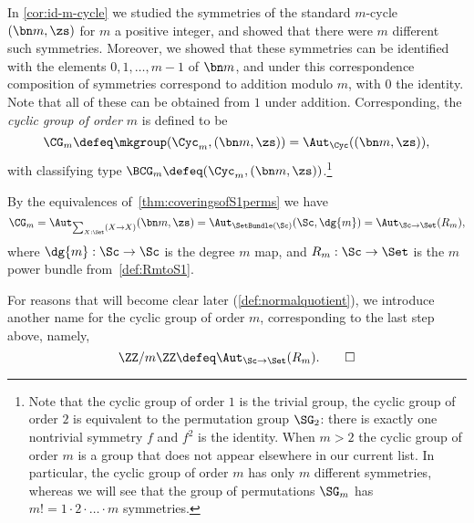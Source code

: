 \begin{example}\label{ex:cyclicgroups}
  In \cref{cor:id-m-cycle} we studied the symmetries of the standard $m$-cycle $(\bn m,\zs)$
  for $m$ a positive integer, and showed that there were $m$ different
  such symmetries.
  Moreover, we showed that these symmetries can be identified with the elements
  $0,1,\dots,m-1$ of $\bn m$,
  and under this correspondence composition of symmetries correspond to
  addition modulo $m$, with $0$ the identity.
  Note that all of these can be obtained from $1$ under addition.
  Corresponding, the \emph{cyclic group of order $m$} is defined to be
  \[
    \CG_m \defeq \mkgroup(\Cyc_m,(\bn m,\zs)) = \Aut_\Cyc((\bn m,\zs)),
  \]
  with classifying type $\BCG_m \defeq (\Cyc_m, (\bn m,\zs))$.\footnote{%
    Note that the cyclic group of order $1$ is the trivial group,
    the cyclic group of order $2$ is equivalent to the permutation group $\SG_2$:
    there is exactly one nontrivial symmetry $f$ and $f^2$ is the identity.
    When $m>2$ the cyclic group of order $m$ is a group that does not appear elsewhere in our current list.
    In particular, the cyclic group of order $m$ has only $m$ different symmetries, whereas we will see that the group of permutations $\SG_m$ has $m!=1\cdot 2\cdot\dots\cdot m$ symmetries.}

  By the equivalences of~\cref{thm:coveringsofS1perms} we have
  \[
    \CG_m = \Aut_{\sum_{X:\Set}(X\to X)}(\bn m,\zs)
    = \Aut_{\SetBundle(\Sc)}(\Sc,\dg{m})
    = \Aut_{\Sc\to\Set}(R_m),
  \]
  where $\dg{m} : \Sc \to \Sc$ is the degree $m$ map,
  and $R_m : \Sc \to \Set$ is the $m$\th power bundle from~\cref{def:RmtoS1}.

  For reasons that will become clear later (\cref{def:normalquotient}),
  we introduce another name for the cyclic group of order $m$, corresponding
  to the last step above, namely,
  \[
    \ZZ/m\ZZ \defeq \Aut_{\Sc\to\Set}(R_m).\qedhere
  \]
\end{example}

